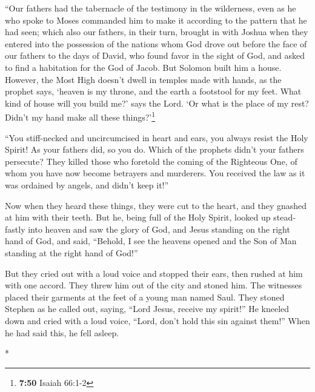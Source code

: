 \begin{paracol}{2}
\begin{otherlanguage}{english}
 ``Our fathers had the tabernacle of the testimony in the
wilderness, even as he who spoke to Moses commanded him to make it
according to the pattern that he had seen;  which also
our fathers, in their turn, brought in with Joshua when they entered
into the possession of the nations whom God drove out before the face of
our fathers to the days of David,  who found favor in the
sight of God, and asked to find a habitation for the God of Jacob.
 But Solomon built him a house.  However,
the Most High doesn't dwell in temples made with hands, as the prophet
says,  `heaven is my throne, and the earth a footstool
for my feet. What kind of house will you build me?' says the Lord. `Or
what is the place of my rest?  Didn't my hand make all
these things?'\footnote{\textbf{7:50} Isaiah 66:1-2}

 ``You stiff-necked and uncircumcised in heart and ears,
you always resist the Holy Spirit! As your fathers did, so you do.
 Which of the prophets didn't your fathers persecute?
They killed those who foretold the coming of the Righteous One, of whom
you have now become betrayers and murderers.  You
received the law as it was ordained by angels, and didn't keep it!''

 Now when they heard these things, they were cut to the
heart, and they gnashed at him with their teeth.  But he,
being full of the Holy Spirit, looked up steadfastly into heaven and saw
the glory of God, and Jesus standing on the right hand of God,
 and said, ``Behold, I see the heavens opened and the Son
of Man standing at the right hand of God!''

 But they cried out with a loud voice and stopped their
ears, then rushed at him with one accord.  They threw him
out of the city and stoned him. The witnesses placed their garments at
the feet of a young man named Saul.  They stoned Stephen
as he called out, saying, ``Lord Jesus, receive my spirit!''
 He kneeled down and cried with a loud voice, ``Lord,
don't hold this sin against them!'' When he had said this, he fell
asleep.

\end{otherlanguage}

\switchcolumn[0]*

\hypertarget{la-primera-persecuciuxf3n-de-la-comunidad-cristiana-en-jerusaluxe9n}{%
}
\end{paracol}

